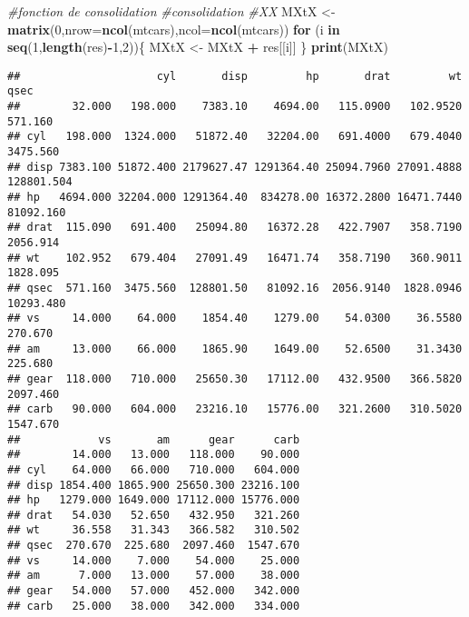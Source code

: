 \documentclass[
]{article}
\newenvironment{Shaded}{\begin{snugshade}}{\end{snugshade}}
\newcommand{\AttributeTok}[1]{\textcolor[rgb]{0.13,0.29,0.53}{#1}}
\newcommand{\CommentTok}[1]{\textcolor[rgb]{0.56,0.35,0.01}{\textit{#1}}}
\newcommand{\ControlFlowTok}[1]{\textcolor[rgb]{0.13,0.29,0.53}{\textbf{#1}}}
\newcommand{\DecValTok}[1]{\textcolor[rgb]{0.00,0.00,0.81}{#1}}
\newcommand{\FunctionTok}[1]{\textcolor[rgb]{0.13,0.29,0.53}{\textbf{#1}}}
\newcommand{\NormalTok}[1]{#1}
\newcommand{\OtherTok}[1]{\textcolor[rgb]{0.56,0.35,0.01}{#1}}
\newcommand{\SpecialCharTok}[1]{\textcolor[rgb]{0.81,0.36,0.00}{\textbf{#1}}}
\begin{document}
\begin{Shaded}
\begin{Highlighting}[]
\CommentTok{\#fonction de consolidation}
\CommentTok{\#consolidation}
\CommentTok{\#X\textquotesingle{}X}
\NormalTok{MXtX }\OtherTok{\textless{}{-}} \FunctionTok{matrix}\NormalTok{(}\DecValTok{0}\NormalTok{,}\AttributeTok{nrow=}\FunctionTok{ncol}\NormalTok{(mtcars),}\AttributeTok{ncol=}\FunctionTok{ncol}\NormalTok{(mtcars))}
\ControlFlowTok{for}\NormalTok{ (i }\ControlFlowTok{in} \FunctionTok{seq}\NormalTok{(}\DecValTok{1}\NormalTok{,}\FunctionTok{length}\NormalTok{(res)}\SpecialCharTok{{-}}\DecValTok{1}\NormalTok{,}\DecValTok{2}\NormalTok{))\{}
\NormalTok{ MXtX }\OtherTok{\textless{}{-}}\NormalTok{ MXtX }\SpecialCharTok{+}\NormalTok{ res[[i]]}
\NormalTok{\}}
\FunctionTok{print}\NormalTok{(MXtX)}
\end{Highlighting}
\end{Shaded}

\begin{verbatim}
##                     cyl       disp         hp       drat         wt       qsec
##        32.000   198.000    7383.10    4694.00   115.0900   102.9520    571.160
## cyl   198.000  1324.000   51872.40   32204.00   691.4000   679.4040   3475.560
## disp 7383.100 51872.400 2179627.47 1291364.40 25094.7960 27091.4888 128801.504
## hp   4694.000 32204.000 1291364.40  834278.00 16372.2800 16471.7440  81092.160
## drat  115.090   691.400   25094.80   16372.28   422.7907   358.7190   2056.914
## wt    102.952   679.404   27091.49   16471.74   358.7190   360.9011   1828.095
## qsec  571.160  3475.560  128801.50   81092.16  2056.9140  1828.0946  10293.480
## vs     14.000    64.000    1854.40    1279.00    54.0300    36.5580    270.670
## am     13.000    66.000    1865.90    1649.00    52.6500    31.3430    225.680
## gear  118.000   710.000   25650.30   17112.00   432.9500   366.5820   2097.460
## carb   90.000   604.000   23216.10   15776.00   321.2600   310.5020   1547.670
##            vs       am      gear      carb
##        14.000   13.000   118.000    90.000
## cyl    64.000   66.000   710.000   604.000
## disp 1854.400 1865.900 25650.300 23216.100
## hp   1279.000 1649.000 17112.000 15776.000
## drat   54.030   52.650   432.950   321.260
## wt     36.558   31.343   366.582   310.502
## qsec  270.670  225.680  2097.460  1547.670
## vs     14.000    7.000    54.000    25.000
## am      7.000   13.000    57.000    38.000
## gear   54.000   57.000   452.000   342.000
## carb   25.000   38.000   342.000   334.000
\end{verbatim}
\end{document}
